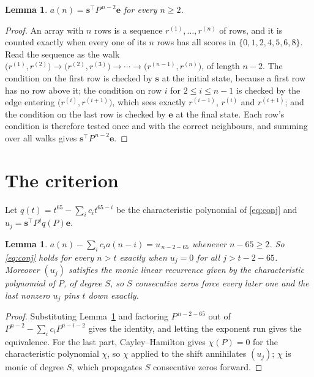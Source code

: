 \documentclass[11pt,a4paper]{article}
\theoremstyle{plain}
\newtheorem{lemma}[theorem]{Lemma}
\theoremstyle{definition}
\begin{document}
\begin{lemma}\label{lem:walk}
$a(n)=\mathbf{s}^{\!\top}P^{\,n-2}\mathbf{e}$ for every $n\ge2$.
\end{lemma}

\begin{proof}
An array with $n$ rows is a sequence $r^{(1)},\dots,r^{(n)}$ of rows, and it is counted
exactly when every one of its $n$ rows has all scores in $\{0,1,2,4,5,6,8\}$. Read the sequence as the
walk $\bigl(r^{(1)},r^{(2)}\bigr)\to\bigl(r^{(2)},r^{(3)}\bigr)\to\cdots\to
\bigl(r^{(n-1)},r^{(n)}\bigr)$, of length $n-2$. The condition on the first row is
checked by $\mathbf{s}$ at the initial state, because a first row has no row above it; the
condition on row $i$ for $2\le i\le n-1$ is checked by the edge entering
$\bigl(r^{(i)},r^{(i+1)}\bigr)$, which sees exactly $r^{(i-1)}$, $r^{(i)}$ and
$r^{(i+1)}$; and the condition on the last row is checked by $\mathbf{e}$ at the final
state. Each row's condition is therefore tested once and with the correct neighbours, and
summing over all walks gives $\mathbf{s}^{\!\top}P^{\,n-2}\mathbf{e}$.
\end{proof}

\section{The criterion}

Let $q(t)=t^{65}-\sum_i c_i t^{65-i}$ be the characteristic polynomial of
\eqref{eq:conj} and $u_j=\mathbf{s}^{\!\top}P^{j}q(P)\mathbf{e}$.

\begin{lemma}\label{lem:crit}
$a(n)-\sum_i c_i a(n-i)=u_{\,n-2-65}$ whenever $n-65\ge2$. So \eqref{eq:conj}
holds for every $n>t$ exactly when $u_j=0$ for all $j>t-2-65$. Moreover $(u_j)$
satisfies the monic linear recurrence given by the characteristic polynomial of $P$, of
degree $S$, so $S$ consecutive zeros force every later one and the last nonzero $u_j$ pins
$t$ down exactly.
\end{lemma}

\begin{proof}
Substituting Lemma~\ref{lem:walk} and factoring $P^{\,n-2-65}$ out of
$P^{n-2}-\sum_i c_i P^{n-i-2}$ gives the identity, and letting the exponent run gives the
equivalence. For the last part, Cayley--Hamilton gives $\chi(P)=0$ for the characteristic
polynomial $\chi$, so $\chi$ applied to the shift annihilates $(u_j)$; $\chi$ is monic of
degree $S$, which propagates $S$ consecutive zeros forward.
\end{proof}
\end{document}
